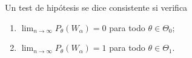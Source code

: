         \begin{definition}
            Un test de hipótesis se dice consistente si verifica
            \begin{enumerate}
                \item $\lim_{n \to \infty} P_{\theta}(W_\alpha) = 0$ para todo $\theta \in \Theta_0$;
                \item $\lim_{n \to \infty} P_{\theta}(W_\alpha) = 1$ para todo $\theta \in \Theta_1$.
            \end{enumerate}
        \end{definition}
